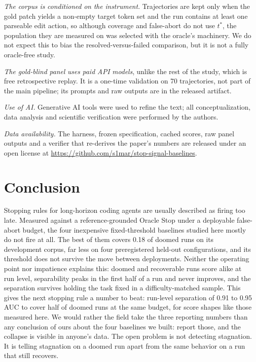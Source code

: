 \documentclass[sigconf,screen]{acmart}
\begin{document}
\emph{The corpus is conditioned on the instrument.} Trajectories are kept only when the gold patch
yields a non-empty target token set and the run contains at least one parseable edit action, so
although coverage and false-abort do not use $t^{*}$, the
population they are measured on was selected with the oracle's machinery. We do not expect this to
bias the resolved-versus-failed comparison, but it is not a fully oracle-free study.

\emph{The gold-blind panel uses paid API models}, unlike the rest of the study, which is free
retrospective replay. It is a one-time validation on 70 trajectories, not part of the main
pipeline; its prompts and raw outputs are in the released artifact.

\emph{Use of AI.} Generative AI tools were used to refine the text; all conceptualization, data
analysis and scientific verification were performed by the authors.

\emph{Data availability.} The harness, frozen specification, cached scores, raw panel outputs
and a verifier that re-derives the paper's numbers are released under an open license at
\url{https://github.com/s1mar/stop-signal-baselines}.

\section{Conclusion}
Stopping rules for long-horizon coding agents are usually described as firing too late. Measured
against a reference-grounded Oracle Stop under a deployable false-abort budget, the four
inexpensive fixed-threshold baselines studied here mostly do not fire at all. The best of them
covers 0.18 of doomed runs on its development corpus, far less on four preregistered held-out
configurations, and its threshold does not survive the move between deployments. Neither the
operating point nor impatience explains this: doomed and recoverable runs score alike at run
level, separability peaks in the first half of a run and never improves, and the separation
survives holding the task fixed in a difficulty-matched sample. This gives the next stopping rule
a number to beat: run-level separation of 0.91 to 0.95 AUC to cover
half of doomed runs at the same budget, for score shapes like those measured here. We would rather
the field take the three reporting numbers than any conclusion of ours about the four baselines we
built: report those, and the collapse is visible in anyone's data. The open problem is not
detecting stagnation. It is telling
stagnation on a doomed run apart from the same behavior on a run that still recovers.
\label{endofcontent}


\end{document}
